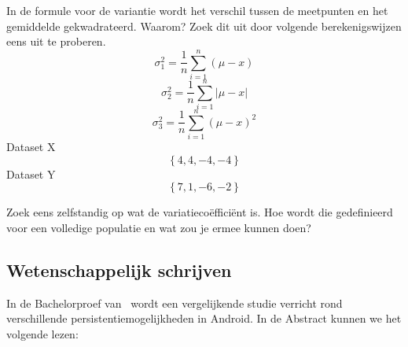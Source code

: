 \begin{exercise}
		In de formule voor de variantie  wordt het
		verschil tussen de meetpunten en het gemiddelde gekwadrateerd.
		Waarom? Zoek dit uit door volgende berekenigswijzen eens uit te proberen.
		\[ \sigma^{2}_{1} = \frac{1}{n} \sum_{i=1}^{n} (\mu - x) \]
		\[ \sigma^{2}_{2} = \frac{1}{n} \sum_{i=1}^{n} \left| \mu - x\right| \]
		\[ \sigma^{2}_{3} = \frac{1}{n} \sum_{i=1}^{n} (\mu - x)^{2} \]
		Dataset X \[ \left\{ 4,4,-4,-4 \right\} \]
		Dataset Y \[ \left\{ 7,1,-6,-2 \right\} \]
\end{exercise}

\begin{exercise}
		Zoek eens zelfstandig op wat de variatieco\"effici\"ent is. Hoe
		wordt die gedefinieerd voor een volledige populatie en wat zou
		je ermee kunnen doen?
\end{exercise}

\subsection{Wetenschappelijk schrijven}
 
 In de Bachelorproef van~\textcite{Akin2016} wordt een vergelijkende studie verricht rond verschillende persistentiemogelijkheden in Android. In de Abstract kunnen we het volgende lezen:
 
